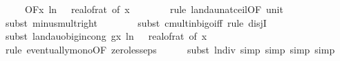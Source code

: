 \begin{isabellebody}
\ \ \ \ {\isasymin}\ O{\isacharbrackleft}{\kern0pt}{\isacharquery}{\kern0pt}F{\isacharbrackright}{\kern0pt}{\isacharparenleft}{\kern0pt}{\isasymlambda}x{\isachardot}{\kern0pt}\ ln\ {\isacharparenleft}{\kern0pt}{}\ {\isacharslash}{\kern0pt}\ real{\isacharunderscore}{\kern0pt}of{\isacharunderscore}{\kern0pt}rat\ {\isacharparenleft}{\kern0pt}{\isasymepsilon}{\isacharunderscore}{\kern0pt}of\ x{\isacharparenright}{\kern0pt}{\isacharparenright}{\kern0pt}{\isacharparenright}{\kern0pt}{\isachardoublequoteclose}\ \isanewline
\ \ \ \ \ \isamarkupfalse%
\ {\isacharparenleft}{\kern0pt}rule\ landau{\isacharunderscore}{\kern0pt}nat{\isacharunderscore}{\kern0pt}ceil{\isacharbrackleft}{\kern0pt}OF\ unit{\isacharunderscore}{\kern0pt}{}{\isacharbrackright}{\kern0pt}{\isacharparenright}{\kern0pt}\isanewline
\ \ \ \ \isamarkupfalse%
\ {\isacharparenleft}{\kern0pt}subst\ minus{\isacharunderscore}{\kern0pt}mult{\isacharunderscore}{\kern0pt}right{\isacharparenright}{\kern0pt}\isanewline
\ \ \ \ \ \ \isamarkupfalse%
\ {\isacharparenleft}{\kern0pt}subst\ cmult{\isacharunderscore}{\kern0pt}in{\isacharunderscore}{\kern0pt}bigo{\isacharunderscore}{\kern0pt}iff{\isacharcomma}{\kern0pt}\ rule\ disjI{}{\isacharparenright}{\kern0pt}\isanewline
\ \ \ \ \ \ \isamarkupfalse%
\ {\isacharparenleft}{\kern0pt}subst\ landau{\isacharunderscore}{\kern0pt}o{\isachardot}{\kern0pt}big{\isachardot}{\kern0pt}in{\isacharunderscore}{\kern0pt}cong{\isacharbrackleft}{\kern0pt}\ g{\isacharequal}{\kern0pt}{\isachardoublequoteopen}{\isasymlambda}x{\isachardot}{\kern0pt}\ ln{\isacharparenleft}{\kern0pt}\ {}\ {\isacharslash}{\kern0pt}\ {\isacharparenleft}{\kern0pt}real{\isacharunderscore}{\kern0pt}of{\isacharunderscore}{\kern0pt}rat\ {\isacharparenleft}{\kern0pt}{\isasymepsilon}{\isacharunderscore}{\kern0pt}of\ x{\isacharparenright}{\kern0pt}{\isacharparenright}{\kern0pt}{\isacharparenright}{\kern0pt}{\isachardoublequoteclose}{\isacharbrackright}{\kern0pt}{\isacharparenright}{\kern0pt}\isanewline
\ \ \ \ \ \ \ \isamarkupfalse%
\ {\isacharparenleft}{\kern0pt}rule\ eventually{\isacharunderscore}{\kern0pt}mono{\isacharbrackleft}{\kern0pt}OF\ zero{\isacharunderscore}{\kern0pt}less{\isacharunderscore}{\kern0pt}eps{\isacharbrackright}{\kern0pt}{\isacharparenright}{\kern0pt}\isanewline
\ \ \ \ \isamarkupfalse%
\ {\isacharparenleft}{\kern0pt}subst\ ln{\isacharunderscore}{\kern0pt}div{\isacharcomma}{\kern0pt}\ simp{\isacharcomma}{\kern0pt}\ simp{\isacharcomma}{\kern0pt}\ simp{\isacharcomma}{\kern0pt}\ simp{\isacharparenright}{\kern0pt}\isanewline

\end{isabellebody}

